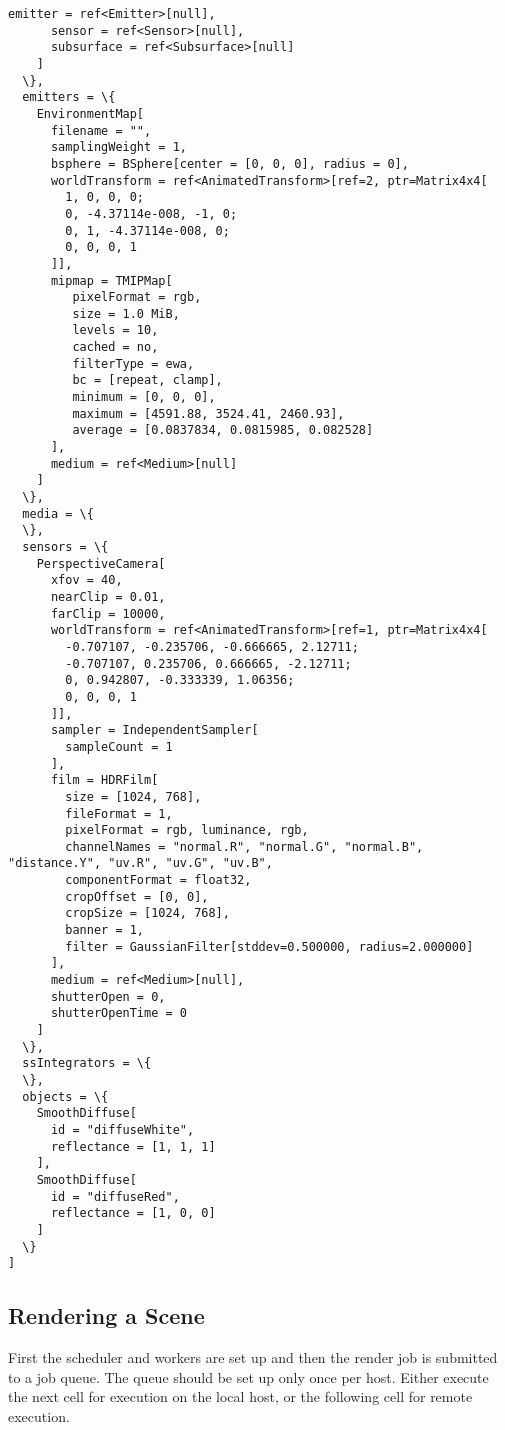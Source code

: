 \documentclass[11pt, a4paper, landscape]{scrartcl}
\begin{document}
\begin{Verbatim}[commandchars=\\\{\}]
      emitter = ref<Emitter>[null],
      sensor = ref<Sensor>[null],
      subsurface = ref<Subsurface>[null]
    ]
  \},
  emitters = \{
    EnvironmentMap[
      filename = "",
      samplingWeight = 1,
      bsphere = BSphere[center = [0, 0, 0], radius = 0],
      worldTransform = ref<AnimatedTransform>[ref=2, ptr=Matrix4x4[
        1, 0, 0, 0;
        0, -4.37114e-008, -1, 0;
        0, 1, -4.37114e-008, 0;
        0, 0, 0, 1
      ]],
      mipmap = TMIPMap[
         pixelFormat = rgb,
         size = 1.0 MiB,
         levels = 10,
         cached = no,
         filterType = ewa,
         bc = [repeat, clamp],
         minimum = [0, 0, 0],
         maximum = [4591.88, 3524.41, 2460.93],
         average = [0.0837834, 0.0815985, 0.082528]
      ],
      medium = ref<Medium>[null]
    ]
  \},
  media = \{
  \},
  sensors = \{
    PerspectiveCamera[
      xfov = 40,
      nearClip = 0.01,
      farClip = 10000,
      worldTransform = ref<AnimatedTransform>[ref=1, ptr=Matrix4x4[
        -0.707107, -0.235706, -0.666665, 2.12711;
        -0.707107, 0.235706, 0.666665, -2.12711;
        0, 0.942807, -0.333339, 1.06356;
        0, 0, 0, 1
      ]],
      sampler = IndependentSampler[
        sampleCount = 1
      ],
      film = HDRFilm[
        size = [1024, 768],
        fileFormat = 1,
        pixelFormat = rgb, luminance, rgb, 
        channelNames = "normal.R", "normal.G", "normal.B", "distance.Y", "uv.R", "uv.G", "uv.B", 
        componentFormat = float32,
        cropOffset = [0, 0],
        cropSize = [1024, 768],
        banner = 1,
        filter = GaussianFilter[stddev=0.500000, radius=2.000000]
      ],
      medium = ref<Medium>[null],
      shutterOpen = 0,
      shutterOpenTime = 0
    ]
  \},
  ssIntegrators = \{
  \},
  objects = \{
    SmoothDiffuse[
      id = "diffuseWhite",
      reflectance = [1, 1, 1]
    ],
    SmoothDiffuse[
      id = "diffuseRed",
      reflectance = [1, 0, 0]
    ]
  \}
]

    \end{Verbatim}

    \subsection{Rendering a Scene}\label{rendering-a-scene}

First the scheduler and workers are set up and then the render job is
submitted to a job queue. The queue should be set up only once per host.
Either execute the next cell for execution on the local host, or the
following cell for remote execution.
\end{document}
